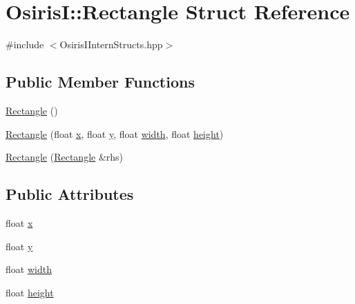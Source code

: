 \hypertarget{struct_osiris_i_1_1_rectangle}{\section{Osiris\-I\-:\-:Rectangle Struct Reference}
\label{struct_osiris_i_1_1_rectangle}
}


{\ttfamily \#include $<$Osiris\-I\-Intern\-Structs.\-hpp$>$}

\subsection*{Public Member Functions}
\begin{DoxyCompactItemize}
\item 
\hyperlink{struct_osiris_i_1_1_rectangle_a8380572f39775cd2b0181e96dc0efeb0}{Rectangle} ()
\item 
\hyperlink{struct_osiris_i_1_1_rectangle_ad0362cc22227783a4dd83a41f73a4b16}{Rectangle} (float \hyperlink{struct_osiris_i_1_1_rectangle_abeee4a4556d9a3b615e7bf1566d0e1ed}{x}, float \hyperlink{struct_osiris_i_1_1_rectangle_a67a96f18272cf2f99c25024168930931}{y}, float \hyperlink{struct_osiris_i_1_1_rectangle_a09997c8ac54820b7f45b755df0f4c46e}{width}, float \hyperlink{struct_osiris_i_1_1_rectangle_a6f8a7c1aea83c02835271bd5f7c57352}{height})
\item 
\hyperlink{struct_osiris_i_1_1_rectangle_accd626bde5583230fb63b773844f4d4f}{Rectangle} (\hyperlink{struct_osiris_i_1_1_rectangle}{Rectangle} \&rhs)
\end{DoxyCompactItemize}
\subsection*{Public Attributes}
\begin{DoxyCompactItemize}
\item 
float \hyperlink{struct_osiris_i_1_1_rectangle_abeee4a4556d9a3b615e7bf1566d0e1ed}{x}
\item 
float \hyperlink{struct_osiris_i_1_1_rectangle_a67a96f18272cf2f99c25024168930931}{y}
\item 
float \hyperlink{struct_osiris_i_1_1_rectangle_a09997c8ac54820b7f45b755df0f4c46e}{width}
\item 
float \hyperlink{struct_osiris_i_1_1_rectangle_a6f8a7c1aea83c02835271bd5f7c57352}{height}
\end{DoxyCompactItemize}


